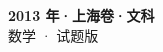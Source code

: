 \documentclass[zihao=-4, a4paper]{ctexart}
\begin{document}
\begin{center}
  {\Large\bfseries 2013 年·上海卷·文科}\\[4pt]
  {\large 数学 · 试题版}
\end{center}
\medskip
{}

\end{document}
